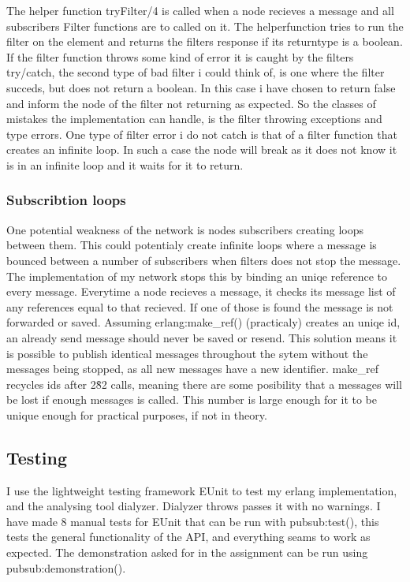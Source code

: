 \documentclass{article}
\begin{document}
The helper function tryFilter/4 is called when a node recieves a 
message and all subscribers Filter functions are to called on 
it. The helperfunction tries to run the filter on the element
and returns the filters response if its returntype is a boolean.
If the filter function throws some kind of error it is caught
by the filters try/catch, the second type of bad filter i could
think of, is one where the filter succeds, but does not return
a boolean. In this case i have chosen to return false and inform
the node of the filter not returning as expected.
So the classes of mistakes the implementation can handle, is the
filter throwing exceptions and type errors.
One type of filter error i do not catch is that of a filter 
function that creates an infinite loop. In such a case the
node will break as it does not know it is in an infinite loop
and it waits for it to return. 

\subsubsection{Subscribtion loops}

One potential weakness of the network is nodes subscribers creating
loops between them. This could potentialy create infinite loops
where a message is bounced between a number of subscribers when 
filters does not stop the message. The implementation of my
network stops this by binding an uniqe reference to every message. 
Everytime a node recieves a message, it checks its message list
of any references equal to that recieved. If one of those is found
the message is not forwarded or saved.
Assuming erlang:make\_ref() (practicaly) creates an uniqe id, an already
send message should never be saved or resend. This solution means
it is possible to publish identical messages throughout the sytem
without the messages being stopped, as all new messages have a new
identifier. make\_ref recycles ids after 2\^82 calls, meaning there
are some posibility that a messages will be lost if enough messages
is called. This number is large enough for it to be unique enough
for practical purposes, if not in theory.

\subsection{Testing}

I use the lightweight testing framework EUnit to test my erlang 
implementation, and the analysing tool dialyzer. Dialyzer throws
passes it with no warnings. I have made 8 manual tests for EUnit
that can be run with pubsub:test(), this tests the general
functionality of the API, and everything seams to work as expected.
The demonstration asked for in the assignment can be run using pubsub:demonstration().
\end{document}
